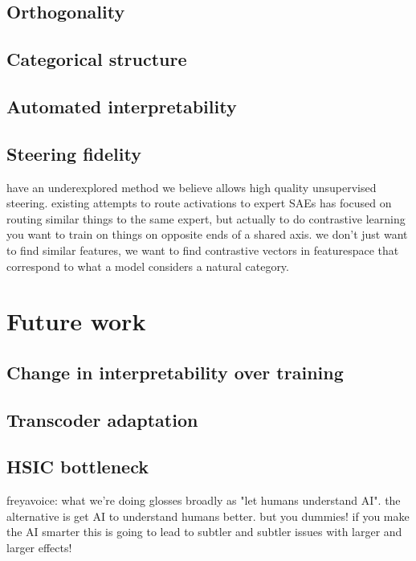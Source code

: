 \subsection{Orthogonality}

\subsection{Categorical structure}

\subsection{Automated interpretability}

\subsection{Steering fidelity}

have an underexplored method we believe allows high quality unsupervised steering.
existing attempts to route activations to expert SAEs has focused on routing similar things to the same expert, but actually to do contrastive learning you want to train on things on opposite ends of a shared axis. we don't just want to find similar features, we want to find contrastive vectors in featurespace that correspond to what a model considers a natural category.

\section{Future work}

\subsection{Change in interpretability over training}

\subsection{Transcoder adaptation}

\subsection{HSIC bottleneck}

freyavoice: 
what we're doing glosses broadly as "let humans understand AI". the alternative is get AI to understand humans better.
but you dummies! if you make the AI smarter this is going to lead to subtler and subtler issues with larger and larger effects!


